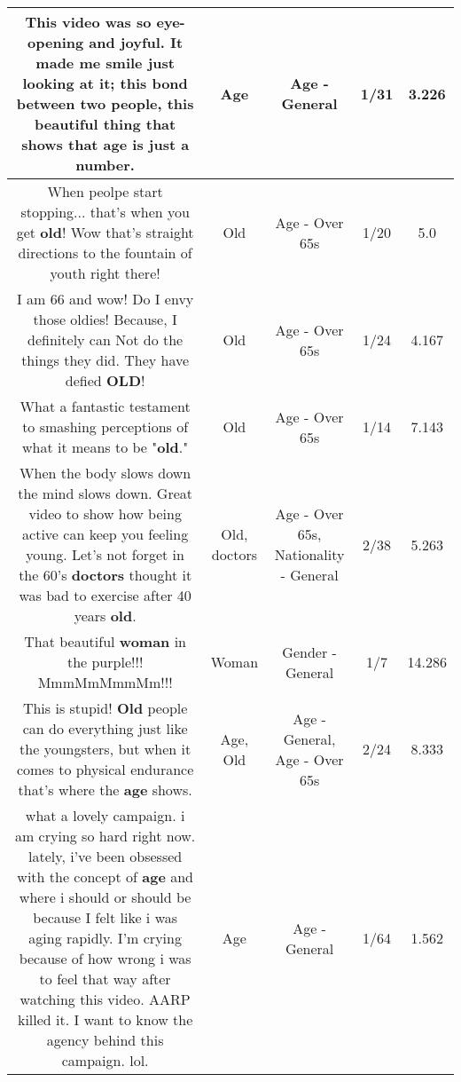 \documentclass[11pt]{article}
\newlength\mylength
\begin{document}
\begin{center}
\begin{longtable}{|C{.65\mylength}|C{.30\mylength}|C{.12\mylength}|C{.12\mylength}|C{.12\mylength}|}
  \small This video was so eye-opening and joyful. It made me smile just looking at it; this bond between two people, this beautiful thing that shows that \textbf{age} is just a number.\normalsize   & Age & Age - General & 1/31 & 3.226 \\  \hline
  \small When peolpe start stopping... that's when you get \textbf{old}! Wow that's straight directions to the fountain of youth right there!\normalsize   & Old & Age - Over 65s & 1/20 & 5.0 \\  \hline
  \small I am 66 and wow! Do I envy those oldies! Because, I definitely can Not do the things they did. They have defied \textbf{OLD}!\normalsize   & Old & Age - Over 65s & 1/24 & 4.167 \\  \hline
  \small What a fantastic testament to smashing perceptions of what it means to be "\textbf{old}."\normalsize   & Old & Age - Over 65s & 1/14 & 7.143 \\  \hline
  \small When the body slows down the mind slows down. Great video to show how being active can keep you feeling young. Let's not forget in the 60's \textbf{doctors} thought it was bad to exercise after 40 years \textbf{old}.\normalsize   & Old, doctors & Age - Over 65s, Nationality - General & 2/38 & 5.263 \\  \hline
  \small That beautiful \textbf{woman} in the purple!!! MmmMmMmmMm!!!\normalsize   & Woman & Gender - General & 1/7 & 14.286 \\  \hline
  \small This is stupid! \textbf{Old} people can do everything just like the youngsters, but when it comes to physical endurance that's where the \textbf{age} shows.\normalsize   & Age, Old & Age - General, Age - Over 65s & 2/24 & 8.333 \\  \hline
  \small what a lovely campaign. i am crying so hard right now. lately, i've been obsessed with the concept of \textbf{age} and where i should or should be because I felt like i was aging rapidly. I'm crying because of how wrong i was to feel that way after watching this video. AARP killed it. I want to know the agency behind this campaign. lol.\normalsize   & Age & Age - General & 1/64 & 1.562 \\  \hline

\end{longtable}
\end{center}
\end{document}
